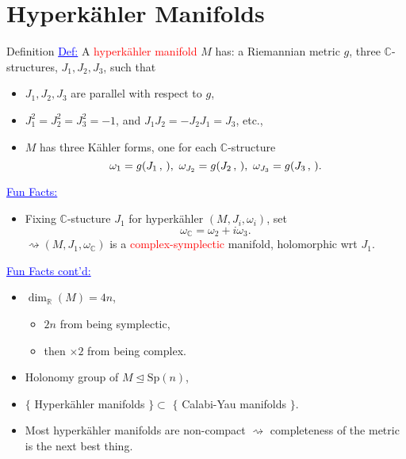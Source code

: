 \section{Hyperk\"ahler Manifolds}

\begin{frame}{Definition}
    \textcolor{blue}{\underline{Def:}} A \textcolor{red}{hyperk\"ahler manifold} $M$ has: a Riemannian metric $g$, three $\mathbb{C}$-structures, $J_{1}, J_{2}, J_{3}$, such that
        \begin{itemize}
            \item $J_{1}, J_{2}, J_{3}$ are parallel with respect to $g$,
            \item $J_{1}^{2} = J_{2}^{2} = J_{3}^{2} = -1$, and $J_{1}J_{2} = -J_{2}J_{1} = J_{3}$, etc.,
            \item $M$ has three K\"ahler forms, one for each $\mathbb{C}$-structure
            \[
                \omega_{1} = g(J_{1}\,,\,),\ \omega_{J_{2}} = g(J_{2}\,,\,),\ \omega_{J_{3}} = g(J_{3}\,,\,).    
            \]
        \end{itemize}        
    \textcolor{blue}{\underline{Fun Facts:}}
    \begin{itemize}
        \item Fixing $\mathbb{C}$-stucture $J_{1}$ for hyperk\"ahler $(M, J_{i}, \omega_{i})$, set
        \[
            \omega_{\mathbb{C}} = \omega_{2} + i\omega_{3}.    
        \]
        $\rightsquigarrow (M,J_{1}, \omega_{\mathbb{C}})$ is a \textcolor{red}{complex-symplectic} manifold, holomorphic wrt $J_{1}$.
    \end{itemize}
\end{frame}

\begin{frame}{}
    \textcolor{blue}{\underline{Fun Facts cont'd:}} 
        \begin{itemize}
            \item $\dim_{\mathbb{R}}(M) = 4n$,
            \begin{itemize}
                \item $2n$ from being symplectic,
                \item then $\times 2$ from being complex.
            \end{itemize}
            \item Holonomy group of $M \unlhd \text{Sp}(n)$,
            \item $\{$ Hyperk\"ahler manifolds $\} \subset$ $\{$ Calabi-Yau manifolds $\}$.
            \item Most hyperk\"ahler manifolds are non-compact $\rightsquigarrow$ completeness of the metric is the next best thing.
        \end{itemize}
\end{frame}

